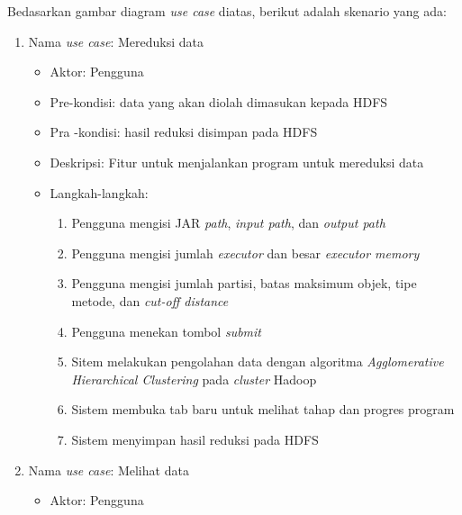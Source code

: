 Bedasarkan gambar diagram \textit{use case} diatas, berikut adalah skenario yang ada:

\begin{enumerate}

\item Nama \textit{use case}: Mereduksi data

\begin{itemize}
\item Aktor: Pengguna

\item Pre-kondisi: data yang akan diolah dimasukan kepada HDFS

\item Pra -kondisi: hasil reduksi disimpan pada HDFS

\item Deskripsi: Fitur untuk menjalankan program untuk mereduksi data

\item Langkah-langkah:

\begin{enumerate}

\item Pengguna mengisi JAR \textit{path}, \textit{input path}, dan \textit{output path}

\item Pengguna mengisi jumlah \textit{executor} dan besar \textit{executor memory}

\item Pengguna mengisi jumlah partisi, batas maksimum objek, tipe metode, dan \textit{cut-off distance} 

\item Pengguna menekan tombol \textit{submit}

\item Sitem melakukan pengolahan data dengan algoritma \textit{Agglomerative Hierarchical Clustering} pada \textit{cluster} Hadoop

\item Sistem membuka tab baru untuk melihat tahap dan progres program

\item Sistem menyimpan hasil reduksi pada HDFS
\end{enumerate}

\end{itemize}


\item Nama \textit{use case}: Melihat data

\begin{itemize}
\item Aktor: Pengguna


\end{itemize}
\end{enumerate}
